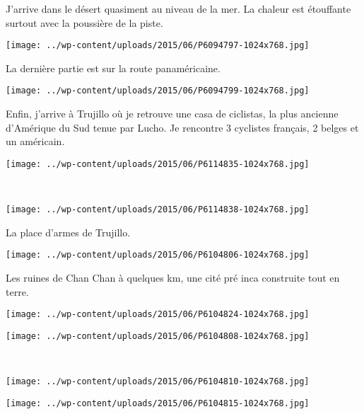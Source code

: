 J'arrive dans le désert quasiment au niveau de la mer. La chaleur est étouffante surtout avec la poussière de la piste. 
\begin{center} \texttt{[image: ../wp-content/uploads/2015/06/P6094797-1024x768.jpg]} \end{center}
\vspace{-\topsep}
\pagebreak

La dernière partie est sur la route panaméricaine. 
\begin{center} \texttt{[image: ../wp-content/uploads/2015/06/P6094799-1024x768.jpg]} \end{center}

Enfin, j'arrive à Trujillo où je retrouve une casa de ciclistas, la plus ancienne d'Amérique du Sud tenue par Lucho. Je rencontre 3 cyclistes français, 2 belges et un américain. 
\begin{center} \texttt{[image: ../wp-content/uploads/2015/06/P6114835-1024x768.jpg]} \end{center}
\vspace{-\topsep}
\pagebreak
~
\vspace{-4mm}
\begin{center} \texttt{[image: ../wp-content/uploads/2015/06/P6114838-1024x768.jpg]} \end{center}

La place d'armes de Trujillo. 
\begin{center} \texttt{[image: ../wp-content/uploads/2015/06/P6104806-1024x768.jpg]} \end{center}
\vspace{-\topsep}
\pagebreak

Les ruines de Chan Chan à quelques km, une cité pré inca construite tout en terre. 
\begin{center} \texttt{[image: ../wp-content/uploads/2015/06/P6104824-1024x768.jpg]} \end{center}
\begin{center} \texttt{[image: ../wp-content/uploads/2015/06/P6104808-1024x768.jpg]} \end{center}
\vspace{-\topsep}
\vspace{-2.75mm}
\pagebreak
~\\
\begin{center} \texttt{[image: ../wp-content/uploads/2015/06/P6104810-1024x768.jpg]} \end{center}
\begin{center} \texttt{[image: ../wp-content/uploads/2015/06/P6104815-1024x768.jpg]} \end{center}
\vspace{-\topsep}
\vspace{-2.75mm}
\pagebreak

